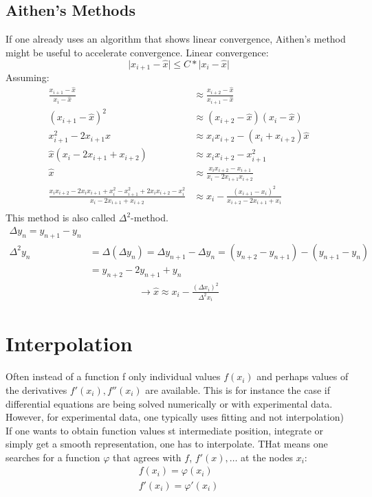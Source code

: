 \section{Aithen's Methods}\label{sec:aithen's-methods}
If one already uses an algorithm that shows linear convergence, Aithen's method might be useful to
accelerate convergence.
Linear convergence:
\begin{equation*}
    \lvert x_{i+1} - \hat{x} \rvert \leq C * \lvert x_i - \hat{x} \rvert
\end{equation*}
Assuming:
\begin{align*}
    \frac{ x_{i+1}-\hat{x} }{x_i - \hat{x}} &\approx
    \frac{ x_{i+2}-\hat{x}}{x_{i+1}-\hat{x}}\\
    (x_{i+1}-\hat{x})^2 &\approx (x_{i+2}-\hat{x})(x_i-\hat{x})\\
    x_{i+1}^2-2x_{i+1}\hat{x} &\approx x_i x_{i+2}-(x_i+x_{i+2})\hat{x}\\
    \hat{x}(x_i-2x_{i+1}+x_{i+2}) &\approx x_i x_{i+2}- x_{i+1}^2\\
    \hat{x} &\approx \frac{x_i x_{i+2}-x_{i+1}}{x_i-2x_{i+1} x_{i+2}}\\
    \frac{x_i x_{i+2}-2x_i x_{i+1}+x_i^2-x_{i+1}^2+2x_i x_{i+2}-x_i^2}{x_i-2x_{i+1}+x_{i+2}}&\approx x_i-\frac{(x_{i+1}-x_i)^2}{x_{i+2}-2x_{i+1}+x_i}\\
\end{align*}
This method is also called $\Delta^2$-method.
\begin{align*}
    \Delta y_n = y_{n+1}-y_n\\
    \Delta^2 y_n &= \Delta(\Delta y_n) = \Delta y_{n+1}-\Delta y_n = (y_{n+2}-y_{n+1})-(y_{n+1}-y_n)\\
    &=y_{n+2} -2y_{n+1}+y_n
\end{align*}
\begin{align*}
    \to \hat{x}\approx x_i - \frac{(\Delta x_i)^2}{\Delta^2 x_i}
\end{align*}

\chapter{Interpolation}\label{ch:interpolation}
Often instead of a function f only individual values $f(x_i)$ and
perhaps values of the derivatives $f'(x_i), f''(x_i)$ are available.
This is for instance the case if differential equations are being solved
numerically or with experimental data.
However, for experimental data, one typically uses fitting and not interpolation)
If one wants to obtain function values st intermediate position, integrate or
simply get a smooth representation, one has to interpolate.
THat means one searches for a function $\varphi$ that agrees with $f$, $f'(x), \ldots$
at the nodes $x_i$:
\begin{align*}
    f(x_i)=\varphi(x_i)\\
    f'(x_i)=\varphi'(x_i)
\end{align*}

